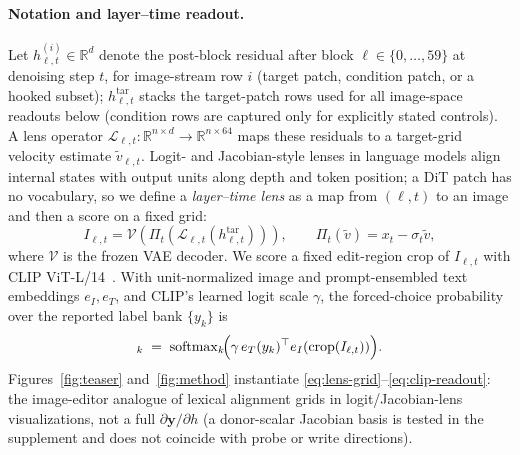 \documentclass[letterpaper]{article} %
\begin{document}
\paragraph{Notation and layer--time readout.}
Let $h_{\ell,t}^{(i)}\!\in\!\mathbb{R}^{d}$ denote the post-block residual
after block $\ell\!\in\!\{0,\ldots,59\}$ at denoising step $t$, for
image-stream row $i$ (target patch, condition patch, or a hooked subset);
$h^{\mathrm{tar}}_{\ell,t}$ stacks the target-patch rows used for all
image-space readouts below (condition rows are captured only for explicitly
stated controls). A lens operator
$\mathcal{L}_{\ell,t}:\mathbb{R}^{n\times d}\!\to\!\mathbb{R}^{n\times64}$
maps these residuals to a target-grid velocity estimate $\tilde v_{\ell,t}$.
Logit- and Jacobian-style lenses in language models align internal states
with output units along depth and token position; a DiT patch has no
vocabulary, so we define a \emph{layer--time lens} as a map from
$(\ell,t)$ to an image and then a score on a fixed grid:
\begin{equation}
  I_{\ell,t}
  = \mathcal{V}\!\left(\Pi_t\!\left(
  \mathcal{L}_{\ell,t}(h^{\mathrm{tar}}_{\ell,t})\right)\right),
  \qquad
  \Pi_t(\tilde v)=x_t-\sigma_t\tilde v,
  \label{eq:lens-grid}
\end{equation}
where $\mathcal{V}$ is the frozen VAE decoder. We score a fixed edit-region
crop of $I_{\ell,t}$ with CLIP ViT-L/14~\citep{radford2021clip}. With
unit-normalized image and prompt-ensembled text embeddings $e_I,e_T$, and
CLIP's learned logit scale $\gamma$, the forced-choice probability over the
reported label bank $\{y_k\}$ is
\begin{equation}
  [\mathcal{M}_{\ell,t}]_k
  \;=\;
  \mathrm{softmax}_k\!\Bigl(
    \gamma\, e_T(y_k)^\top e_I(\mathrm{crop}(I_{\ell,t}))
  \Bigr).
  \label{eq:clip-readout}
\end{equation}
Figures~\ref{fig:teaser} and~\ref{fig:method} instantiate
\eqref{eq:lens-grid}--\eqref{eq:clip-readout}: the image-editor analogue of
lexical alignment grids in logit/Jacobian-lens visualizations, not a full
$\partial \mathbf{y}/\partial h$ (a donor-scalar Jacobian basis is tested in
the supplement and does not coincide with probe or write directions).
\end{document}
